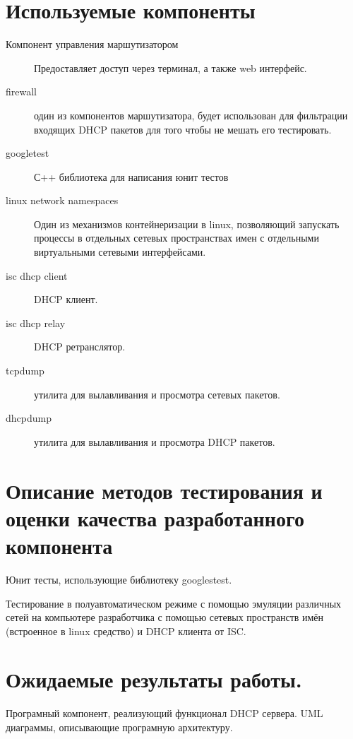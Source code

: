 \documentclass[12pt]{article}
\begin{document}
\section{Используемые компоненты}
\begin{description}
    \item[Компонент управления маршутизатором] Предоставляет доступ через терминал, а также web интерфейс.
    \item[firewall] один из компонентов маршутизатора, будет использован для фильтрации входящих DHCP пакетов для того чтобы не мешать его тестировать.
    \item[googletest] С++ библиотека для написания юнит тестов
    \item[linux network namespaces] Один из механизмов контейнеризации в linux, позволяющий запускать процессы в отдельных сетевых пространствах имен с отдельными виртуальными сетевыми интерфейсами.
    \item[isc dhcp client] DHCP клиент.
    \item[isc dhcp relay] DHCP ретранслятор.
    \item[ tcpdump] утилита для вылавливания и просмотра сетевых пакетов.
    \item[dhcpdump] утилита для вылавливания и просмотра DHCP пакетов.
\end{description}

\section{Описание методов тестирования и оценки качества разработанного компонента}
Юнит тесты, использующие библиотеку googlestest.

Тестирование в полуавтоматическом режиме с помощью эмуляции различных сетей на компьютере разработчика с помощью сетевых пространств имён (встроенное в linux средство) и DHCP клиента от ISC.

\section{Ожидаемые результаты работы.}
Програмный компонент, реализующий функционал DHCP сервера.
UML диаграммы, описывающие програмную архитектуру.
\end{document}
